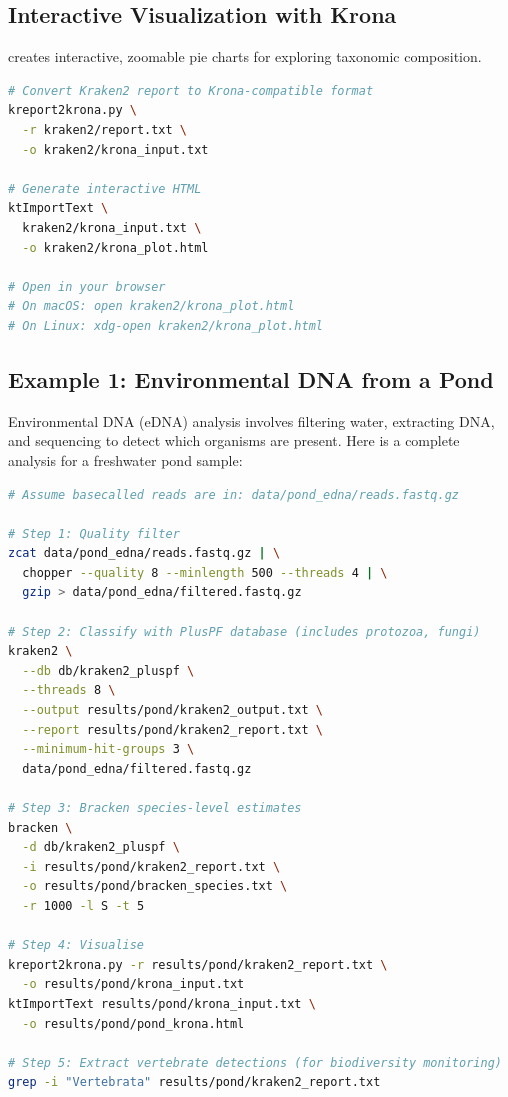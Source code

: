 \subsection{Interactive Visualization with Krona}
\label{subsec:diyanalysis:krona}

 creates interactive, zoomable pie charts for exploring taxonomic composition.

\begin{lstlisting}[language=bash,caption={Creating Krona visualisations.},label=lst:diy-krona]
# Convert Kraken2 report to Krona-compatible format
kreport2krona.py \
  -r kraken2/report.txt \
  -o kraken2/krona_input.txt

# Generate interactive HTML
ktImportText \
  kraken2/krona_input.txt \
  -o kraken2/krona_plot.html

# Open in your browser
# On macOS: open kraken2/krona_plot.html
# On Linux: xdg-open kraken2/krona_plot.html
\end{lstlisting}

\subsection{Example 1: Environmental DNA from a Pond}
\label{subsec:diyanalysis:edna_pond}

Environmental DNA (\acrshort{eDNA}) analysis involves filtering water, extracting DNA, and sequencing to detect which organisms are present. Here is a complete analysis for a freshwater pond sample:

\begin{lstlisting}[language=bash,caption={eDNA pond water analysis pipeline.},label=lst:diy-edna-pond]
# Assume basecalled reads are in: data/pond_edna/reads.fastq.gz

# Step 1: Quality filter
zcat data/pond_edna/reads.fastq.gz | \
  chopper --quality 8 --minlength 500 --threads 4 | \
  gzip > data/pond_edna/filtered.fastq.gz

# Step 2: Classify with PlusPF database (includes protozoa, fungi)
kraken2 \
  --db db/kraken2_pluspf \
  --threads 8 \
  --output results/pond/kraken2_output.txt \
  --report results/pond/kraken2_report.txt \
  --minimum-hit-groups 3 \
  data/pond_edna/filtered.fastq.gz

# Step 3: Bracken species-level estimates
bracken \
  -d db/kraken2_pluspf \
  -i results/pond/kraken2_report.txt \
  -o results/pond/bracken_species.txt \
  -r 1000 -l S -t 5

# Step 4: Visualise
kreport2krona.py -r results/pond/kraken2_report.txt \
  -o results/pond/krona_input.txt
ktImportText results/pond/krona_input.txt \
  -o results/pond/pond_krona.html

# Step 5: Extract vertebrate detections (for biodiversity monitoring)
grep -i "Vertebrata" results/pond/kraken2_report.txt
\end{lstlisting}


